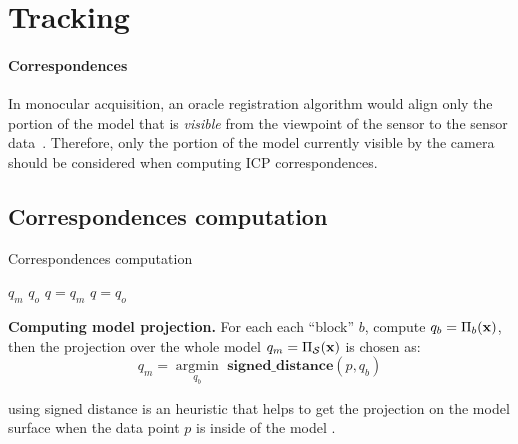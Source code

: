 \section{Tracking}

\paragraph{Correspondences}
In monocular acquisition, an oracle registration algorithm would align only the portion of the model that is \emph{visible} from the viewpoint of the sensor to the sensor data~\cite{tagliasacchi2015robust}. Therefore, only the portion of the model currently visible by the camera should be considered when computing ICP correspondences. 



\subsection*{Correspondences computation}

\begin{algorithm}
\caption{Correspondences computation }
\begin{algorithmic}[1]
  		 \State {} $q_m$
  		  \State {}
  		  \State {} $q_o$
  		  	\State $q = q_m$
  		  \Else
  		  	\State $q = q_o$
  		  \EndIf
	\EndFor
\end{algorithmic}
\label{alg:correspondences}
\end{algorithm}

\textbf{Computing model projection.}
For each each ``block'' $b$, compute $q_b = \Pi_b(\mathbf{x})$, then the
projection over the whole model $q_m = \Pi_{\mathcal{S}}(\mathbf{x})$ is chosen as: 
\begin{equation*}
	q_m = \underset{q_b}{\operatorname{argmin}}{ \textbf{ signed\_distance}(p, q_b)} 
\end{equation*}

using signed distance is an heuristic that helps to get the projection on the model surface when the data point $p$ is inside of the model .

